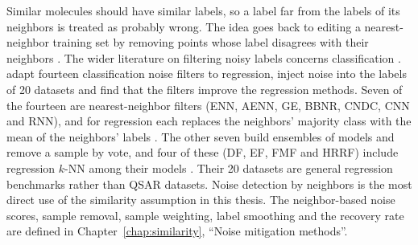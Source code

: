 %
Similar molecules should have similar labels, so a label far from the labels of its neighbors is treated as probably wrong. The idea goes back to editing a nearest-neighbor training set by removing points whose label disagrees with their neighbors \citep{Wilson1972}. The wider literature on filtering noisy labels concerns classification \citep{Brodley1999, frenay2014classification}. \citet{Martin2021} adapt fourteen classification noise filters to regression, inject noise into the labels of 20 datasets and find that the filters improve the regression methods. Seven of the fourteen are nearest-neighbor filters (ENN, AENN, GE, BBNR, CNDC, CNN and RNN), and for regression each replaces the neighbors' majority class with the mean of the neighbors' labels \citep{Martin2021}. The other seven build ensembles of models and remove a sample by vote, and four of these (DF, EF, FMF and HRRF) include regression $k$-NN among their models \citep{Martin2021}. Their 20 datasets are general regression benchmarks rather than QSAR datasets.
Noise detection by neighbors is the most direct use of the similarity assumption in this thesis. The neighbor-based noise scores, sample removal, sample weighting, label smoothing and the recovery rate are defined in Chapter~\ref{chap:similarity}, ``Noise mitigation methods''.

